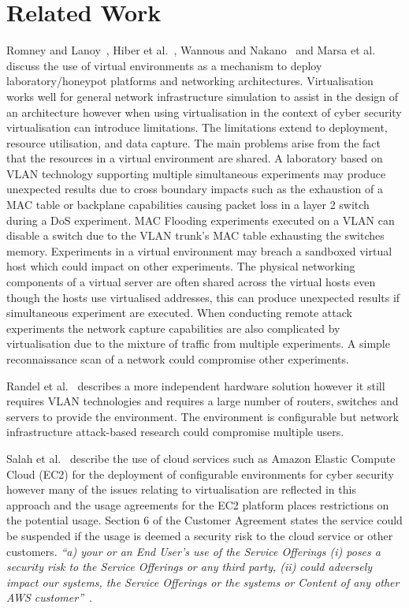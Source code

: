 \documentclass[10pt,journal]{IEEEtran}
\begin{document}
\section{Related Work}\label{sec:RelatedWork}
Romney and Lanoy~\cite{LR:06}, Hiber et al.~\cite{HRS:08}, Wannous and Nakano~\cite{WN:10} and Marsa et al.~\cite{MGDL:13} discuss the use of virtual environments as a mechanism to deploy laboratory/honeypot platforms and networking architectures. Virtualisation works well for general network infrastructure simulation to assist in the design of an architecture however when using virtualisation in the context of cyber security virtualisation can introduce limitations. The limitations extend to deployment, resource utilisation, and data capture. The main problems arise from the fact that the resources in a virtual environment are shared. A laboratory based on VLAN technology supporting multiple simultaneous experiments may produce unexpected results due to cross boundary impacts such as the exhaustion of a MAC table or backplane capabilities causing packet loss in a layer 2 switch during a DoS experiment. MAC Flooding experiments executed on a VLAN can disable a switch due to the VLAN trunk's MAC table exhausting the switches memory. Experiments in a virtual environment may breach a sandboxed virtual host which could impact on other experiments. The physical networking components of a virtual server are often shared across the virtual hosts even though the hosts use virtualised addresses, this can produce unexpected results if simultaneous experiment are executed. When conducting remote attack experiments the network capture capabilities are also complicated by virtualisation due to the mixture of traffic from multiple experiments. A simple reconnaissance scan of a network could compromise other experiments.

Randel et al.~\cite{ACG:06} describes a more independent hardware solution however it still requires VLAN technologies and requires a large number of routers, switches and servers to provide the environment. The environment is configurable but network infrastructure attack-based research could compromise multiple users.

Salah et al.~\cite{SHZ:15} describe the use of cloud services such as Amazon Elastic Compute Cloud (EC2) for the deployment of configurable environments for cyber security however many of the issues relating to virtualisation are reflected in this approach and the usage agreements for the EC2 platform places restrictions on the potential usage. Section 6 of the Customer Agreement states the service could be suspended if the usage is deemed a security risk to the cloud service or other customers. \textit{``a) your or an End User’s use of the Service Offerings (i) poses a security risk to the Service Offerings or any third party, (ii) could adversely impact our systems, the Service Offerings or the systems or Content of any other AWS customer''}~\cite{AWS:18}.
\end{document}
